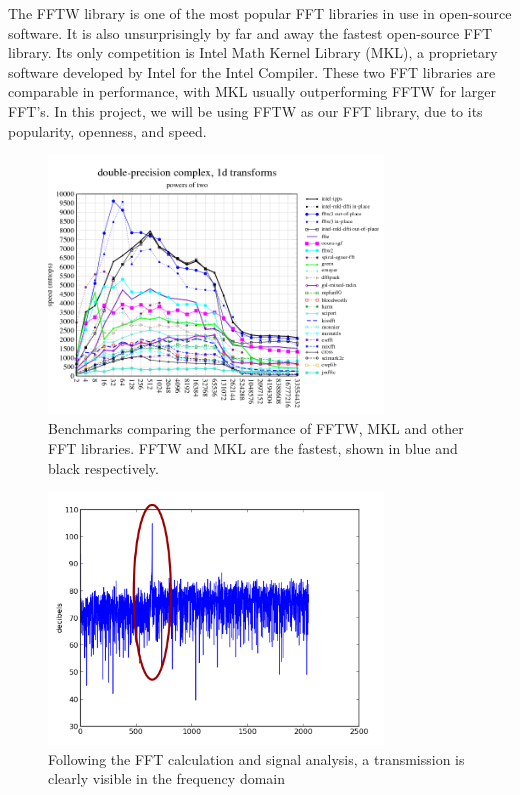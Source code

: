 \documentclass[conference]{IEEEtran}
\begin{document}
The FFTW library is one of the most popular FFT libraries in use in
open-source software. It is also unsurprisingly by far and away the fastest open-source
FFT library. Its only competition is Intel Math Kernel Library (MKL),
a proprietary software developed by Intel for the Intel Compiler. These
two FFT libraries are comparable in performance, with MKL usually outperforming
FFTW for larger FFT's. In this project, we will be using FFTW as our 
FFT library, due to its popularity, openness, and speed.

\begin{figure}[ht!]
\centering
\includegraphics[width=3.5in]{fftwmkl.png}
\caption{Benchmarks comparing the performance of FFTW, MKL and other FFT libraries. FFTW and MKL are the fastest, shown in blue and black respectively. \cite{fftw:benchmarks}}
\label{fig:fftwmkl}
\end{figure}


\begin{figure}[ht!]
\centering
\includegraphics[width=3.5in]{signalgraph.png}
\caption{Following the FFT calculation and signal analysis, a transmission is clearly visible in the frequency domain}
\label{fig:pipeline}
\end{figure}
\end{document}
